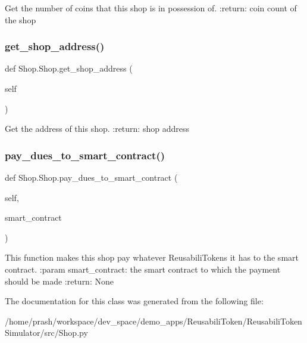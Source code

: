 \begin{DoxyVerb}Get the number of coins that this shop is in possession of.
:return: coin count of the shop
\end{DoxyVerb}
 \mbox{\label{class_shop_1_1_shop_a2fc55120d0b88ac30018a14a98632e43}} 
\subsubsection{\texorpdfstring{get\+\_\+shop\+\_\+address()}{get\_shop\_address()}}
{\footnotesize\ttfamily def Shop.\+Shop.\+get\+\_\+shop\+\_\+address (\begin{DoxyParamCaption}\item[{}]{self }\end{DoxyParamCaption})}

\begin{DoxyVerb}Get the address of this shop.
:return: shop address
\end{DoxyVerb}
 \mbox{\label{class_shop_1_1_shop_a34e743286fb3f62aef7cf8f9ec242e03}} 
\subsubsection{\texorpdfstring{pay\+\_\+dues\+\_\+to\+\_\+smart\+\_\+contract()}{pay\_dues\_to\_smart\_contract()}}
{\footnotesize\ttfamily def Shop.\+Shop.\+pay\+\_\+dues\+\_\+to\+\_\+smart\+\_\+contract (\begin{DoxyParamCaption}\item[{}]{self,  }\item[{}]{smart\+\_\+contract }\end{DoxyParamCaption})}

\begin{DoxyVerb}This function makes this shop pay whatever ReusabiliTokens it has to the smart contract.
:param smart_contract: the smart contract to which the payment should be made
:return: None
\end{DoxyVerb}
 

The documentation for this class was generated from the following file\+:\begin{DoxyCompactItemize}
\item 
/home/prash/workspace/dev\+\_\+space/demo\+\_\+apps/\+Reusabili\+Token/\+Reusabili\+Token\+Simulator/src/Shop.\+py\end{DoxyCompactItemize}
